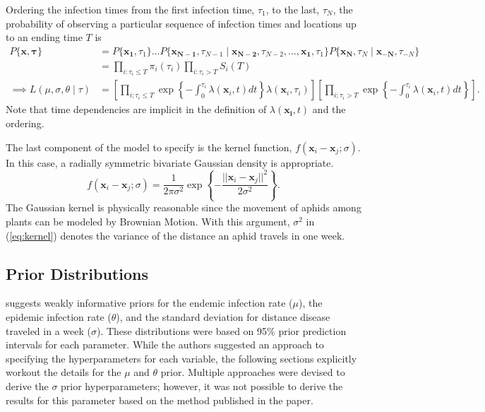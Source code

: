 \documentclass{uwstat572}
\begin{document}
Ordering the infection times from the first infection time, $\tau_1$, to the last, $\tau_N$, the probability of observing a particular sequence of infection times and locations up to an ending time $T$ is
\begin{align*}
P\{\boldsymbol{x}, \boldsymbol{\tau}\} &= P\{\boldsymbol{x_{1}}, \tau_{1} \} \dots P\{\boldsymbol{x_{N-1}}, \tau_{N-1} \mid \boldsymbol{x_{N-2}}, \tau_{N-2}, \dots, \boldsymbol{x_{1}}, \tau_{1} \}  P\{\boldsymbol{x_N}, \tau_N \mid \boldsymbol{x_{-N}}, \tau_{-N} \} \\
	&= \prod_{i: \tau_i \le T} \pi_i(\tau_i)  \prod_{i: \tau_i > T} S_i(T) \\
\implies L(\mu, \sigma, \theta \mid \tau) &= \left[ \prod_{i;\tau_i \le T} \exp \left\{-\int^{\tau_i}_0 \lambda(\boldsymbol{x}_i, t)dt\right \} \lambda(\boldsymbol{x}_i, \tau_i)\right] \left[ \prod_{i;\tau_i > T} \exp \left\{-\int^{\tau_i}_0 \lambda(\boldsymbol{x}_i, t)dt \right\}\right] .
\end{align*}
Note that time dependencies are implicit in the definition of $\lambda(\boldsymbol{x_i}, t)$ and the ordering.

The last component of the model to specify is the kernel function, $f(\boldsymbol{x}_i -\boldsymbol{x}_j; \sigma)$. 
In this case, a radially symmetric bivariate Gaussian density is appropriate. 
\begin{equation} f(\boldsymbol{x}_i-\boldsymbol{x}_j;\sigma) = \frac{1}{2\pi \sigma^2} \exp \left\{-\frac{ ||\boldsymbol{x}_i-\boldsymbol{x}_j||^2}{2\sigma^2} \right\}.
\label{eq:kernel} \end{equation}
The Gaussian kernel is physically reasonable since the movement of aphids among plants can be modeled by Brownian Motion. 
With this argument, $\sigma^2$ in (\ref{eq:kernel}) denotes the variance of the distance an aphid travels in one week. 

\subsection{Prior Distributions}
\citet{Brown} suggests weakly informative priors for the endemic infection rate ($\mu$), the epidemic infection rate ($\theta$), and the standard deviation for distance disease traveled in a week ($\sigma$). 
These distributions were based on 95\% prior prediction intervals for each parameter. 
While the authors suggested an approach to specifying the hyperparameters for each variable, the following sections explicitly workout the details for the $\mu$ and $\theta$ prior. 
Multiple approaches were devised to derive the $\sigma$ prior hyperparameters; however, it was not possible to derive the results for this parameter based on the method published in the paper. 
\end{document}
